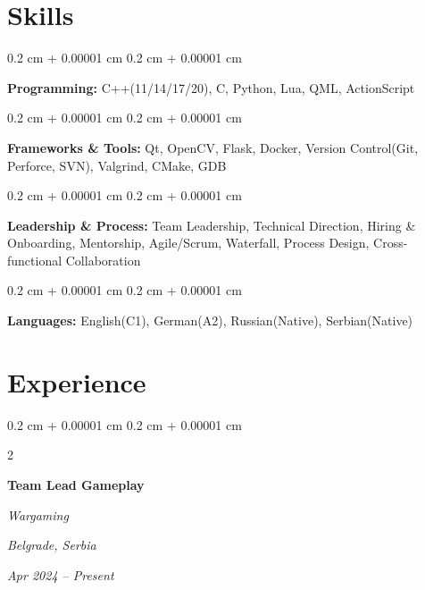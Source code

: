 \documentclass[10pt, letterpaper]{article}
\newenvironment{onecolentry}{
    \begin{adjustwidth}{
        0.2 cm + 0.00001 cm
    }{
        0.2 cm + 0.00001 cm
    }
}{
    \end{adjustwidth}
} %
\newenvironment{twocolentry}[2][]{
    \onecolentry
    \def\secondColumn{#2}
    \setcolumnwidth{\fill, 4.5 cm}
    \begin{paracol}{2}
}{
    \switchcolumn \raggedleft \secondColumn
    \end{paracol}
    \endonecolentry
} %
\begin{document}
    \section{Skills}

        \begin{onecolentry}
            \textbf{Programming:} C++(11/14/17/20), C, Python, Lua, QML, ActionScript
        \end{onecolentry}

        \vspace{0.2 cm}

        \begin{onecolentry}
            \textbf{Frameworks \& Tools:} Qt, OpenCV, Flask, Docker, Version Control(Git, Perforce, SVN), Valgrind, CMake, GDB
        \end{onecolentry}

        \vspace{0.2 cm}
        
        \begin{onecolentry}
            \textbf{Leadership \& Process:} Team Leadership, Technical Direction, Hiring \& Onboarding, Mentorship, Agile/Scrum, Waterfall, Process Design, Cross-functional Collaboration
        \end{onecolentry}

        \vspace{0.2 cm}

        \begin{onecolentry}
            \textbf{Languages:} English(C1), German(A2), Russian(Native), Serbian(Native)
        \end{onecolentry}

    \section{Experience}
    
    \begin{twocolentry}{
        \textit{Belgrade, Serbia}    
            
        \textit{Apr 2024 – Present}}
            \textbf{Team Lead Gameplay}
            
            \textit{Wargaming}
        \end{twocolentry}
\end{document}
